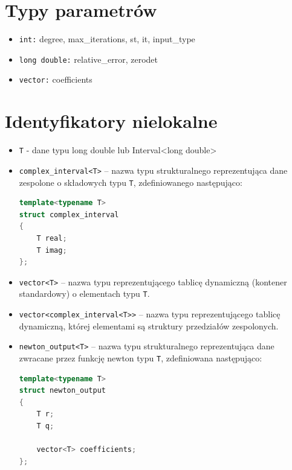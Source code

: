 \documentclass[12pt,a4paper]{article}
\begin{document}
\section{Typy parametrów}
\begin{itemize}
	\item \texttt{int:} degree, max\_iterations, st, it, input\_type
	\item \texttt{long double:} relative\_error, zerodet
	\item \texttt{vector:} coefficients
\end{itemize}

	\newpage
	
	\section{Identyfikatory nielokalne}
	
	\begin{itemize}
		\item \texttt{T} - dane typu long double lub Interval<long double>
		
		\item \texttt{complex\_interval<T>} -- nazwa typu strukturalnego reprezentująca dane zespolone o składowych typu \texttt{T}, zdefiniowanego następująco:
		\begin{lstlisting}[language=C++, basicstyle=\ttfamily\small]			
template<typename T>
struct complex_interval 
{
	T real;
	T imag;
};
		\end{lstlisting}
		
		\item \texttt{vector<T>} -- nazwa typu reprezentującego tablicę dynamiczną (kontener standardowy) o elementach typu \texttt{T}.
		
		\item \texttt{vector<complex\_interval<T>>} -- nazwa typu reprezentującego tablicę dynamiczną, której elementami są struktury przedziałów zespolonych.
		
		\item \texttt{newton\_output<T>} -- nazwa typu strukturalnego reprezentująca dane zwracane przez funkcję newton typu \texttt{T}, zdefiniowana następująco:
		\begin{lstlisting}[language=C++, basicstyle=\ttfamily\small]
template<typename T>
struct newton_output
{
	T r;
	T q;
				
	vector<T> coefficients;
};
		\end{lstlisting}
	\end{itemize}
	
\end{document}
